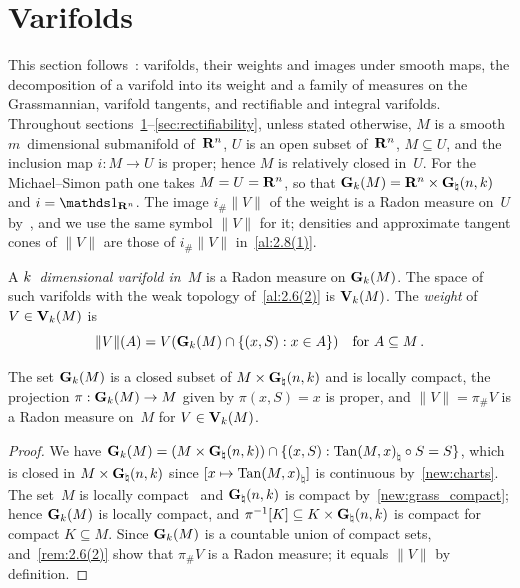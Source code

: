 \section{Varifolds}
\label{sec:varifolds}

\begin{miniremark}
    \label{mr:sec3}
    This section follows~\cite[section~3]{Allard1972}: varifolds, their weights and images under
    smooth maps, the decomposition of a varifold into its weight and a family of measures on
    the Grassmannian, varifold tangents, and rectifiable and integral varifolds. Throughout
    sections~\ref{sec:varifolds}--\ref{sec:rectifiability}, unless stated otherwise, $M$ is a
    smooth $m$~dimensional submanifold of~$\mathbf{R}^{n}$, $U$ is an open subset of~$\mathbf{R}^{n}$,
    $M \subseteq U$, and the inclusion map $i : M \to U$ is proper; hence $M$ is relatively
    closed in~$U$. For the Michael--Simon path one takes $M = U = \mathbf{R}^{n}$, so that $\mathbf{G}_{k}(M)
    = \mathbf{R}^{n} \times \mathbf{G}_{\natural}(n,k)$ and $i = \id{\R^{\adim}}$. The image $i_\#
    \|V\|$ of the weight is a Radon measure on~$U$ by~\cite[2.2.17]{Federer1969}, and we use the
    same symbol $\|V\|$ for it; densities and approximate tangent cones of $\|V\|$ are those of
    $i_\# \|V\|$ in~\ref{al:2.8(1)}.
\end{miniremark}

\begin{definition}
    \label{al:3.1}
    A \emph{$k$~dimensional varifold in~$M$} is a Radon measure on $\mathbf{G}_{k}(M)$. The space of
    such varifolds with the weak topology of~\ref{al:2.6(2)} is $\mathbf{V}_{k}(M)$. The
    \emph{weight} of $V \in \mathbf{V}_{k}(M)$ is
    \begin{displaymath}
        \|V\|(A) = V(\mathbf{G}_{k}(M) \cap \{ (x,S) : x \in A \}) \quad \text{for $A \subseteq M$} \,.
    \end{displaymath}
\end{definition}

\begin{lemma}
    \label{al:3.1:lem}
    The set $\mathbf{G}_{k}(M)$ is a closed subset of $M \times \mathbf{G}_{\natural}(n,k)$ and is locally
    compact, the projection $\pi : \mathbf{G}_{k}(M) \to M$ given by $\pi(x,S) = x$ is proper, and $\|V\| =
    \pi_\# V$ is a Radon measure on~$M$ for $V \in \mathbf{V}_{k}(M)$.
\end{lemma}

\begin{proof}
    We have $\mathbf{G}_{k}(M) = (M \times \mathbf{G}_{\natural}(n,k)) \cap \{ (x,S) : {\operatorname{Tan}(M,x)}_\natural
    \circ S = S \}$, which is closed in $M \times \mathbf{G}_{\natural}(n,k)$ since $[x \mapsto
    {\operatorname{Tan}(M,x)}_\natural]$ is continuous by~\ref{new:charts}. The set~$M$ is locally
    compact~\cite[3.1.19]{Federer1969} and $\mathbf{G}_{\natural}(n,k)$ is compact
    by~\ref{new:grass_compact}; hence $\mathbf{G}_{k}(M)$ is locally compact, and $\pi^{-1}[K] \subseteq K
    \times \mathbf{G}_{\natural}(n,k)$ is compact for compact $K \subseteq M$. Since $\mathbf{G}_{k}(M)$ is
    a countable union of compact sets, \cite[2.2.17]{Federer1969} and~\ref{rem:2.6(2)} show that
    $\pi_\# V$ is a Radon measure; it equals $\|V\|$ by definition.
\end{proof}

